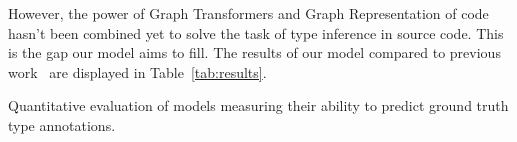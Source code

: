 However, the power of Graph Transformers and Graph Representation of code hasn't been combined yet to solve the task of
type inference in source code.
This is the gap our model aims to fill.
The results of our model compared to previous work~\cite{mir_type4py_2021, allamanis2020typilus, pradel2020typewriter, jesse2021typebert, peng2023generative} are displayed in Table~\ref{tab:results}.

\begin{table}
    \centering
    \caption{Quantitative evaluation of models measuring their ability to
    predict ground truth type annotations.}
    \label{tab:results}
    
\end{table}